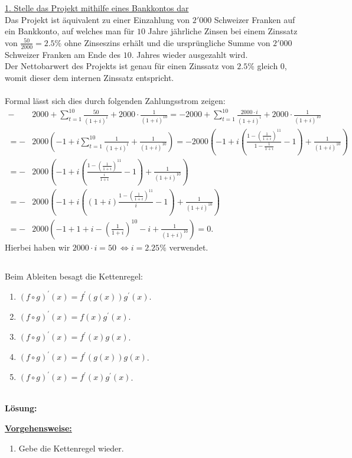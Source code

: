 \underline{1. Stelle das Projekt mithilfe eines Bankkontos dar}\\
Das Projekt ist äquivalent zu einer Einzahlung von $2'000$ Schweizer Franken auf ein Bankkonto, auf welches man für $10$ Jahre jährliche Zinsen bei einem Zinssatz von $\frac{50}{2000} = 2.5 \%$ ohne Zinseszins erhält und die ursprüngliche Summe von $2'000$ Schweizer Franken am Ende des $10$. Jahres wieder ausgezahlt wird.\\
Der Nettobarwert des Projekts ist genau für einen Zinssatz von $2.5 \% $ gleich 0, womit dieser dem internen Zinssatz entspricht.\\
\\
Formal lässt sich dies durch folgenden Zahlungsstrom zeigen:
\begin{align*}
	-&2000 + \sum \limits_{t = 1}^{10} \frac{50}{(1+i)^i} + 2000 \cdot \frac{1}{(1+i)^{10}}
	=
	-2000 + \sum \limits_{t = 1}^{10} \frac{2000 \cdot i}{(1+i)^i} + 2000 \cdot \frac{1}{(1+i)^{10}}\\
	=
	-&2000 \left(-1 + i \sum \limits_{t = 1}^{10 }\frac{1}{(1+i)^t} + \frac{1}{(1+i)^{10}} \right) 
	=
	-2000 \left(-1 + i \left(\frac{1 - \left(\frac{1}{1+i}\right)^{11} }{1 - \frac{1}{1+i}} -1 \right)+ \frac{1}{(1+i)^{10}} \right)\\
	=
	-&2000 \left(-1 + i \left(\frac{1 - \left(\frac{1}{1+i}\right)^{11} }{ \frac{i}{1+i}}  -1 \right)+ \frac{1}{(1+i)^{10}} \right)\\
	=
	-&2000 \left(-1 + i \left( (1+i)\frac{1 - \left(\frac{1}{1+i}\right)^{11} }{ i} -1 \right)+ \frac{1}{(1+i)^{10}} \right )\\
	=
	-&2000 \left(-1 +  1+i  - \left(\frac{1}{1+i}\right)^{10}  -i + \frac{1}{(1+i)^{10}} \right )
	= 0.
\end{align*}
Hierbei haben wir $2000 \cdot i = 50   \ \Leftrightarrow i = 2.25 \%$ verwendet. 


 \newpage

\subsection*{}
Beim Ableiten besagt die Kettenregel:
\renewcommand{\labelenumi}{(\alph{enumi})}
\begin{enumerate}
	\item 
	$ (f \circ g)^\prime(x) = f^\prime(g(x)) g^\prime(x)$.
	\item 
	$ (f \circ g)^\prime(x) = f(x) g^\prime(x)$.
	\item
	$ (f \circ g)^\prime(x) = f^\prime(x) g(x)$.
	\item
	$ (f \circ g)^\prime(x) = f^\prime(g(x)) g(x)$.
	\item
	$ (f \circ g)^\prime(x) = f^\prime(x) g^\prime(x)$.
\end{enumerate}
\ \\
\textbf{Lösung:}
\begin{mdframed}
\underline{\textbf{Vorgehensweise:}}
\renewcommand{\labelenumi}{\theenumi.}
\begin{enumerate}
\item Gebe die Kettenregel wieder.
\end{enumerate}
\end{mdframed}

